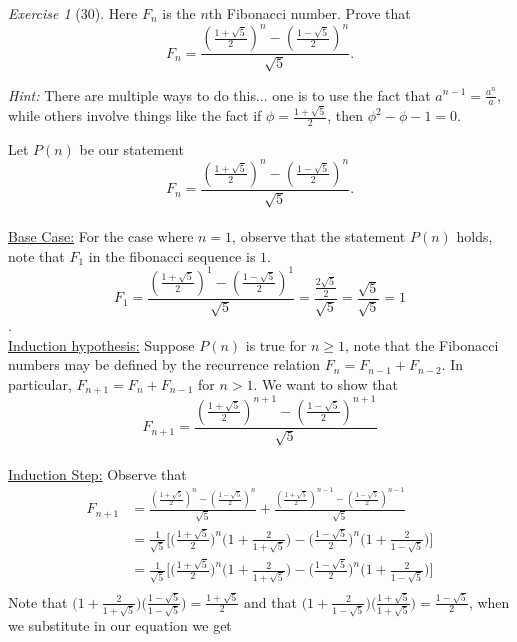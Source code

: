 \documentclass[12pt]{amsart}
\makeatletter
\theoremstyle{remark}
\newtheorem*{exercise}{Exercise}%
\renewenvironment{proof}[1][\proofname]{\par\doublespacing
  \pushQED{\qed}%
  \normalfont \topsep6\p@\@plus6\p@\relax
  \list{}{%
    \settowidth{\leftmargin}{\itshape\proofname:\hskip\labelsep}%
    \setlength{\labelwidth}{0pt}%
    \setlength{\itemindent}{-\leftmargin}%
  }%
  \item[\hskip\labelsep\itshape#1\@addpunct{:}]\ignorespaces
}{%
  \popQED\endlist\@endpefalse
  \singlespacing
}
\theoremstyle{mycomment}
\makeatother
\begin{document}
\begin{exercise}[30] Here $F_{n}$ is the $n$th Fibonacci number. Prove that $$F_{n}=\frac{\left(\frac{1+\sqrt{5}}{2}\right)^{n}-\left(\frac{1-\sqrt{5}}{2}\right)^{n}}{\sqrt{5}}.$$

\emph{Hint:} There are multiple ways to do this... one is to use the fact that $a^{n-1}=\frac{a^{n}}{a}$, while others involve things like the fact if $\phi=\frac{1+\sqrt{5}}{2}$, then $\phi^{2}-\phi-1=0$.
\begin{proof}
Let $P(n)$ be our statement $$F_{n}=\frac{\left(\frac{1+\sqrt{5}}{2}\right)^{n}-\left(\frac{1-\sqrt{5}}{2}\right)^{n}}{\sqrt{5}}.$$\\
\underline{Base Case:} For the case where $n = 1$, observe that the statement $P(n)$ holds, note that $F_1$ in the fibonacci sequence is $1$.  $$F_{1}=\frac{\left(\frac{1+\sqrt{5}}{2}\right)^{1}-\left(\frac{1-\sqrt{5}}{2}\right)^{1}}{\sqrt{5}}= \frac{\frac{2\sqrt{5}}{2}}{\sqrt{5}} = \frac{\sqrt{5}}{\sqrt{5}}=  1$$. \\
\underline{Induction hypothesis:} Suppose $P(n)$ is true for $n \geq 1$, note that the Fibonacci numbers may be defined by the recurrence relation $F_n = F_{n-1} + F_{n-2}$. In particular, $F_{n+1} = F_{n} + F_{n-1}$ for $n > 1$. We want to show that $$F_{n+1} = \frac{\left(\frac{1+\sqrt{5}}{2}\right)^{n+1}-\left(\frac{1-\sqrt{5}}{2}\right)^{n+1}}{\sqrt{5}}$$  \\
\underline{Induction Step:} Observe that
\begin{align*}
  F_{n+1} &=\frac{\left(\frac{1+\sqrt{5}}{2}\right)^{n}-\left(\frac{1-\sqrt{5}}{2}\right)^{n}}{\sqrt{5}} + \frac{\left(\frac{1+\sqrt{5}}{2}\right)^{n-1}-\left(\frac{1-\sqrt{5}}{2}\right)^{n-1}}{\sqrt{5}} \\
         &= \frac{1}{\sqrt{5}}\biggl[ \biggl(\frac{1+\sqrt{5}}{2}\biggr)^n \biggl( 1 + \frac{2}{1+ \sqrt{5}}\biggr) -   \biggl(\frac{1-\sqrt{5}}{2}\biggr)^n \biggl( 1 + \frac{2}{1- \sqrt{5}}\biggr)   \biggr] \\
 &= \frac{1}{\sqrt{5}}\biggl[ \biggl(\frac{1+\sqrt{5}}{2}\biggr)^n \biggl( 1 + \frac{2}{1+ \sqrt{5}}\biggr) -   \biggl(\frac{1-\sqrt{5}}{2}\biggr)^n \biggl( 1 + \frac{2}{1- \sqrt{5}}\biggr)   \biggr] \\
\end{align*}Note that $ \biggl( 1 + \frac{2}{1+ \sqrt{5}}\biggr)\biggl( \frac{1 - \sqrt{5}}{1-\sqrt{5}}\biggr) = \frac{1+\sqrt{5}}{2} $ and that $ \biggl( 1 + \frac{2}{1- \sqrt{5}}\biggr)\biggl( \frac{1 + \sqrt{5}}{1+\sqrt{5}}\biggr) = \frac{1-\sqrt{5}}{2} $, when we substitute in our equation we get 

\end{proof}
\end{exercise}
\end{document}
